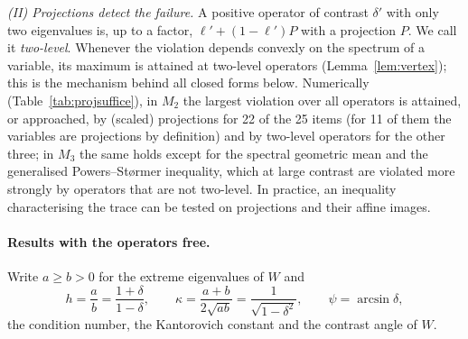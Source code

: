 \documentclass[11pt]{article}
\theoremstyle{plain}
\theoremstyle{definition}
\theoremstyle{remark}
\begin{document}
\emph{(II) Projections detect the failure.} A positive operator of contrast $\delta'$ with only two eigenvalues is, up
to a factor, $\ell'+(1-\ell')P$ with a projection $P$. We call it \emph{two-level}. Whenever the violation depends convexly
on the spectrum of a variable, its maximum is attained at two-level operators (Lemma~\ref{lem:vertex}); this is the
mechanism behind all closed forms below. Numerically (Table~\ref{tab:projsuffice}), in $M_2$ the largest violation over all
operators is attained, or approached, by (scaled) projections for 22 of the 25 items (for 11 of them the variables are
projections by definition) and by two-level operators for the other three; in $M_3$ the same holds except for the
spectral geometric mean and the generalised Powers--St{\o}rmer inequality, which at large contrast are violated more
strongly by operators that are not two-level. In practice, an inequality characterising the trace can be tested on projections and their affine images.

\paragraph{Results with the operators free.} Write $a\ge b>0$ for the extreme eigenvalues of $W$ and
\[
  h=\frac ab=\frac{1+\delta}{1-\delta},\qquad \kappa=\frac{a+b}{2\sqrt{ab}}=\frac1{\sqrt{1-\delta^2}},\qquad
  \psi=\arcsin\delta,
\]
the condition number, the Kantorovich constant and the contrast angle of $W$.
\end{document}
